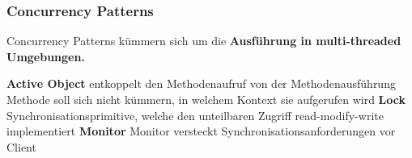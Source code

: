 \subsubsection{Concurrency Patterns}

Concurrency Patterns kümmern sich um die \textbf{Ausführung in multi-threaded Umgebungen.}

\vspace{0.1cm}


    

\begin{outline}
    \1 \textbf{Active Object}
        \2 entkoppelt den Methodenaufruf von der Methodenausführung \\
            Methode soll sich nicht kümmern, in welchem Kontext sie aufgerufen wird
    \1 \textbf{Lock}
        \2 Synchronisationsprimitive, welche den unteilbaren Zugriff read-modify-write implementiert
    \1 \textbf{Monitor}
        \2 Monitor versteckt Synchronisationsanforderungen vor Client
\end{outline}

